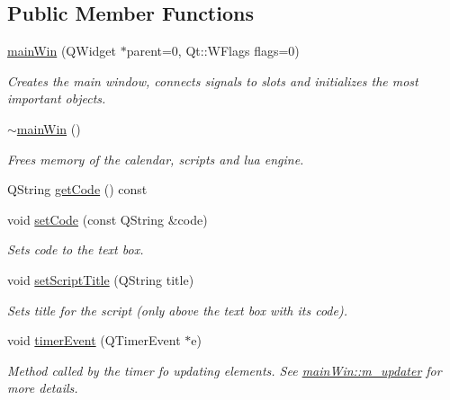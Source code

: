 \subsection*{Public Member Functions}
\begin{DoxyCompactItemize}
\item 
\hyperlink{classmain_win_a837aa6380bc037afd022629b56b7aca9}{main\-Win} (Q\-Widget $\ast$parent=0, Qt\-::\-W\-Flags flags=0)
\begin{DoxyCompactList}\small\item\em Creates the main window, connects signals to slots and initializes the most important objects. \end{DoxyCompactList}\item 
\hyperlink{classmain_win_a70326ccd243eb2060b1b5a3150025a9d}{$\sim$main\-Win} ()
\begin{DoxyCompactList}\small\item\em Frees memory of the calendar, scripts and lua engine. \end{DoxyCompactList}\item 
Q\-String \hyperlink{classmain_win_abeb1092d0b748df7ceaeb13334a89030}{get\-Code} () const 
\item 
void \hyperlink{classmain_win_afe80ea88b1fb5e13d56acfddf6fee0e6}{set\-Code} (const Q\-String \&code)
\begin{DoxyCompactList}\small\item\em Sets code to the text box. \end{DoxyCompactList}\item 
void \hyperlink{classmain_win_aa70a0f3f1c66ffa1a7d4012526b56c44}{set\-Script\-Title} (Q\-String title)
\begin{DoxyCompactList}\small\item\em Sets title for the script (only above the text box with its code). \end{DoxyCompactList}\item 
void \hyperlink{classmain_win_a5d97000005953e9adbda7c98602a5ae9}{timer\-Event} (Q\-Timer\-Event $\ast$e)
\begin{DoxyCompactList}\small\item\em Method called by the timer fo updating elements. See \hyperlink{classmain_win_a079d09aeafe1af36f8f0d1bd4d88d803}{main\-Win\-::m\-\_\-updater} for more details. \end{DoxyCompactList}\end{DoxyCompactItemize}
